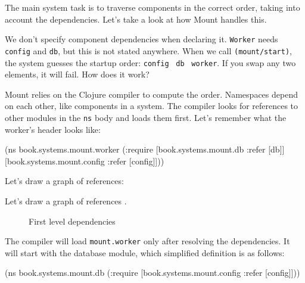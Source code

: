 
The main system task is to traverse components in the correct order, taking into account the dependencies. Let's take a look at how Mount handles this.

We don't specify component dependencies when declaring it. \verb|Worker| needs \verb|config| and \verb|db|, but this is not stated anywhere. When we call \verb|(mount/start)|, the system guesses the startup order: \verb|config|~\arr{} \verb|db|~\arr{} \verb|worker|. If you swap any two elements, it will fail. How does it work?

Mount relies on the Clojure compiler to compute the order. Namespaces depend on each other, like components in a system. The compiler looks for references to other modules in the \verb|ns| body and loads them first. Let's remember what the worker's header looks like:

\begin{english}
  \begin{clojure}
(ns book.systems.mount.worker
  (:require
   [book.systems.mount.db :refer [db]]
   [book.systems.mount.config
     :refer [config]]))
  \end{clojure}
\end{english}


\ifprint

\noindent
Let's draw a graph of references:

\begin{figure}[h!]
\end{figure}

\fi

\ifebook

\noindent
Let's draw a graph of references .

\begin{figure}[ht!]
  \caption{First level dependencies}
  \label{fig:chart-sys-2}
\end{figure}

\fi

The compiler will load \verb|mount.worker| only after resolving the dependencies. It will start with the database module, which simplified definition is as follows:

\ifnarrow

\begin{english}
  \begin{clojure}
(ns book.systems.mount.db
  (:require
   [book.systems.mount.config
    :refer [config]]))
  \end{clojure}
\end{english}

